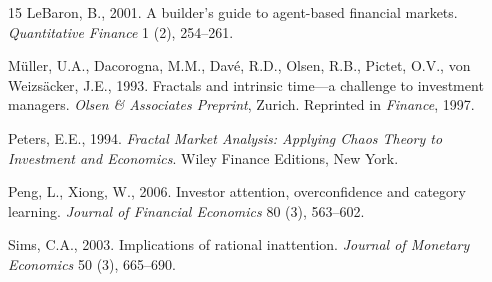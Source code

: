 \documentclass[preprint,12pt,authoryear]{elsarticle}
\begin{document}
\begin{thebibliography}{15}
LeBaron, B., 2001.
A builder's guide to agent-based financial markets.
\textit{Quantitative Finance} 1 (2), 254--261.

M{\"u}ller, U.A., Dacorogna, M.M., Dav{\'e}, R.D., Olsen, R.B.,
Pictet, O.V., von Weizs{\"a}cker, J.E., 1993.
Fractals and intrinsic time---a challenge to investment managers.
\textit{Olsen \& Associates Preprint}, Zurich.
Reprinted in \textit{Finance}, 1997.

Peters, E.E., 1994.
\textit{Fractal Market Analysis: Applying Chaos Theory to Investment and
Economics}.
Wiley Finance Editions, New York.

Peng, L., Xiong, W., 2006.
Investor attention, overconfidence and category learning.
\textit{Journal of Financial Economics} 80 (3), 563--602.

Sims, C.A., 2003.
Implications of rational inattention.
\textit{Journal of Monetary Economics} 50 (3), 665--690.

\end{thebibliography}
\end{document}
